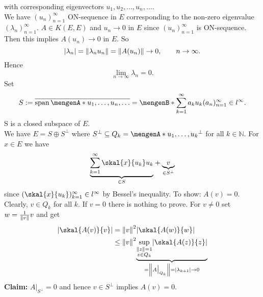 \begin{beweis}
\begin{description}
\[		\]
		with corresponding eigenvectors $u_1,u_2, \dots,u_n, \dots$. \\
		We have $(u_n)_{n=1}^{\infty}$ ON-sequence in $E$ corresponding to the non-zero eigenvalue $(\lambda_n)_{n=1}^{\infty}$. $A \in K(E,E)$ and $u_n \to 0$ in $E$ since 
		$(u_n)_{n=1}^{\infty}$ is ON-sequence. \\
		Then this implies $A(u_n) \to 0$ in $E$. So \[
			\abs{\lambda_n} = \norm{\lambda_n u_n} = \norm{A(u_n)} \to 0, \qquad n \to \infty.
		\]
		Hence \[
			\lim_{n \to \infty} \lambda_n = 0.
		\]
		Set 
		\[
			S := \overline{\spn\set{u_1, \dots,u_n, \dots}} = \set[\sum_{k=1}^{\infty}a_k u_k]{ (a_n)_{n=1}^{\infty} \in l^\infty}.
		\]
		S is a closed subspace of $E$. \\ We have $E = S \oplus S^{\perp}$ where $S^{\perp} \subseteq Q_k = \set{u_1,\dots,u_k}^{\perp}$ for all $k \in \mathbb{N}$.
		For $x \in E$ we have
		\[
			\underset{\in S}{\underbrace{\sum_{k=1}^{\infty} \skal{x}{u_k}u_k}} + \underset{\in S^{\perp}}{\underbrace{v}}
		\]
		since $(\skal{x}{u_k})_{k=1}^{\infty} \in l^\infty$ by Bessel's inequality. 
		To show: $A(v)=0$. Clearly, $v \in Q_k$ for all $k$. If $v = 0$ there is nothing to prove. For $v \neq 0$ set $w= \frac{1}{\norm{v}}v$ and get
		\begin{align*}
			\abs{\skal{A(v)}{v}} &= \norm{v}^2 \abs{ \skal{A(w)}{w}} \\
			&\leq \norm{v}^2 \underset{= \norm{A  \big|_{Q_k}^{}} = \abs{\lambda_{k+1}} \to 0}{\underbrace{\sup_{ \substack{\norm{z}=1 \\ z \in Q_k}} \abs{\skal{A(z)}{z}}}}
		\end{align*}
		\textbf{Claim:} \text{    }$A  \big|_{S^{\perp}}^{} = 0$ and hence $v \in S^{\perp}$ implies $A(v) = 0$.
	\end{description}
\end{beweis}

